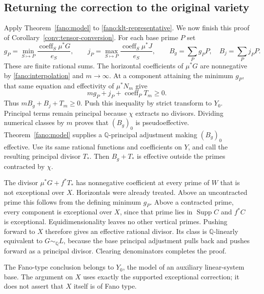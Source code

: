 \subsection{Returning the correction to the original variety}

Apply Theorem~\ref{fano:model} to \eqref{fano:klt-representative}.
We now finish this proof of Corollary~\ref{conv:tensor-conversion}.  For each base
prime $P$ set
\[
 g_P=\min_{S\mapsto P}\frac{\operatorname{coeff}_S\mu^*G}{e_S},
 \qquad
 j_P=\max_{S\mapsto P}\frac{\operatorname{coeff}_S\mu^*J}{e_S},
 \qquad B_g=\sum_Pg_PP,\quad B_j=\sum_Pj_PP.
\]
These are finite rational sums.  The horizontal coefficients of
$\mu^*G$ are nonnegative by \eqref{fano:interpolation} and
$m\to\infty$.  At a component attaining the minimum $g_P$, that
same equation and effectivity of $\mu^*N_m$ give
\[
 m g_P+j_P+\operatorname{coeff}_P T_m\geq0.
\]
Thus $mB_g+B_j+T_m\geq0$.  Push this inequality by strict transform
to $Y_0$.  Principal terms remain principal because $\chi$ extracts
no divisors.  Dividing numerical classes by $m$ proves that
$(B_g)_0$ is pseudoeffective.  Theorem~\ref{fano:model} supplies
a $\mathbb Q$-principal adjustment making $(B_g)_0$ effective.
Use its same rational functions and coefficients on $Y$, and call
the resulting principal divisor $T_*$.  Then $B_g+T_*$ is effective
outside the primes contracted by $\chi$.

The divisor $\mu^*G+f^*T_*$ has nonnegative coefficient at every
prime of $W$ that is not exceptional over $X$.  Horizontals were
already treated.  Above an uncontracted prime this follows from
the defining minimum $g_P$.  Above a contracted prime, every
component is exceptional over $X$, since that prime lies in
$\operatorname{Supp}C$ and $f^*C$ is exceptional.  Equidimensionality
leaves no other vertical primes.  Pushing forward to $X$ therefore
gives an effective rational divisor.  Its class is
$\mathbb Q$-linearly equivalent to $G\sim_{\mathbb Q}L$, because
the base principal adjustment pulls back and pushes forward as a
principal divisor.  Clearing denominators completes the proof.

The Fano-type conclusion belongs to $Y_0$, the model of an auxiliary
linear-system base.  The argument on $X$ uses exactly the supported
exceptional correction; it does not assert that $X$ itself is of
Fano type.
